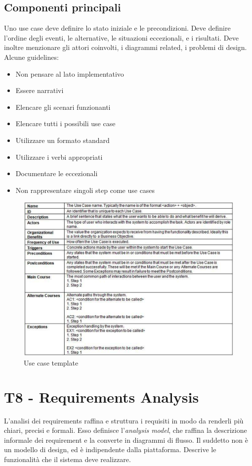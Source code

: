 \documentclass[11pt]{article}
\begin{document}
\subsection{Componenti principali}
Uno use case deve definire lo stato iniziale e le precondizioni. Deve definire l'ordine degli eventi, le alternative, le situazioni eccezionali, e i risultati. Deve inoltre menzionare gli attori coinvolti, i diagrammi related, i problemi di design. Alcune guidelines:
\begin{itemize}
    \item Non pensare al lato implementativo
    \item Essere narrativi
    \item Elencare gli scenari funzionanti
    \item Elencare tutti i possibili use case
    \item Utilizzare un formato standard
    \item Utilizzare i verbi appropriati
    \item Documentare le eccezionali
    \item Non rappresentare singoli step come use cases
\end{itemize}
\begin{figure}[H]
    \centering
    \includegraphics[width=0.8\linewidth]{res/teoria/UseCaseTemplate.png}
    \caption{Use case template}
\end{figure}

\section{T8 - Requirements Analysis}
L'analisi dei requirements raffina e struttura i requisiti in modo da renderli più chiari, precisi e formali. Esso definisce l'\textit{analysis model}, che raffina la descrizione informale dei requirement e la converte in diagrammi di flusso. Il suddetto non è un modello di design, ed è indipendente dalla piattaforma. Descrive le funzionalità che il sistema deve realizzare. 
\end{document}

